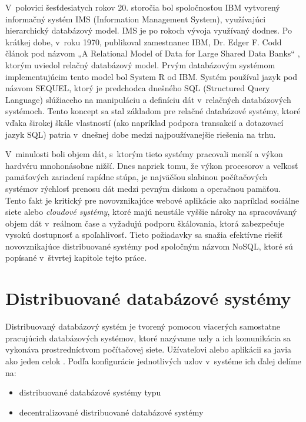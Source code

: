 \documentclass[11pt,twoside,a4paper]{book}
\begin{document}
V~polovici šesťdesiatych rokov 20. storočia bol spoločnosťou IBM vytvorený informačný systém IMS (Information Management System), využívajúci hierarchický databázový model. IMS je po rokoch vývoja využívaný dodnes. Po krátkej dobe, v~roku 1970, publikoval zamestnanec IBM, Dr. Edger F. Codd článok pod názvom „A Relational Model of Data for Large Shared Data Banks“ \cite{Codd:1970:RMD:362384.362685}, ktorým uviedol relačný databázový model. Prvým databázovým systémom implementujúcim tento model bol System R od IBM. Systém používal jazyk pod názvom SEQUEL, ktorý je predchodca dnešného SQL (Structured Query Language) slúžiaceho na manipuláciu a definíciu dát v~relačných databázových systémoch. Tento koncept sa stal základom pre relačné databázové systémy, ktoré vďaka širokej škále vlastností (ako napríklad podpora transakcií a dotazovací jazyk SQL) patria v~dnešnej  dobe medzi najpoužívanejšie riešenia na trhu.

V~minulosti boli objem dát, s~ktorým tieto systémy pracovali menší a výkon hardvéru mnohonásobne nižší. Dnes napriek tomu, že výkon procesorov a veľkosť pamäťových zariadení rapídne stúpa, je najväčšou slabinou počítačových systémov rýchlosť prenosu dát medzi pevným diskom a operačnou pamäťou. Tento fakt je kritický pre novovznikajúce webové aplikácie ako napríklad sociálne siete alebo \emph{cloudové systémy}, ktoré majú neustále vyššie nároky na spracovávaný objem dát v~reálnom čase a vyžadujú podporu škálovania, ktorá zabezpečuje vysokú dostupnosť a spoľahlivosť. Tieto požiadavky sa snažia efektívne riešiť novovznikajúce distribuované systémy pod spoločným názvom NoSQL, ktoré sú popísané v~štvrtej kapitole tejto práce. %


\section{Distribuované databázové systémy}
Distribuovaný databázový systém je tvorený pomocou viacerých samostatne pracujúcich databázových systémov, ktoré nazývame uzly a ich komunikácia sa vykonáva prostredníctvom počítačovej siete. Užívateľovi alebo aplikácii sa javia ako jeden celok \cite{hewitt2010cassandra}. Podľa konfigurácie jednotlivých uzlov v~systéme ich ďalej delíme na:
\begin{itemize}
 \item distribuované databázové systémy typu \emph{}
 \item decentralizované distribuované databázové systémy
\end{itemize}
\end{document}
